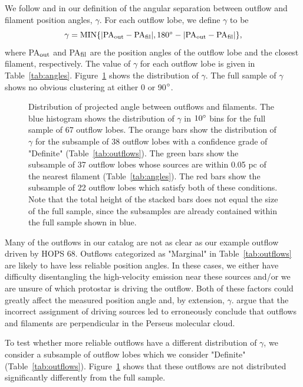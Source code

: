 \documentclass[twocolumn]{aastex63}
\newcommand{\nlobes}{67}
\newcommand{\example}{HOPS 68}
\begin{document}
We follow \citet{Stephens17} and \citet{Kong19} in our definition of the angular separation between outflow and filament position angles, $\gamma$. For each outflow lobe, we define $\gamma$ to be 
\begin{equation}
    \gamma = \rm{MIN}\{|\rm{PA}_{\rm out} - \rm{PA}_{\rm fil}|, 180\degr - |\rm{PA}_{\rm out} - \rm{PA}_{\rm fil}|\},
\end{equation}
where PA$_{\rm out}$ and PA$_{\rm fil}$ are the position angles of the outflow lobe and the closest filament, respectively. The value of $\gamma$ for each outflow lobe is given in Table~\ref{tab:angles}. Figure~\ref{fig:gamma_hist} shows the distribution of $\gamma$. The full sample of $\gamma$ shows no obvious clustering at either 0 or 90$\mbox{$^\circ$}$.

\begin{figure}
\caption{Distribution of projected angle between outflows and filaments. The blue histogram shows the distribution of $\gamma$ in $10\mbox{$^\circ$}$ bins for the full sample of \nlobes{} outflow lobes. The orange bars show the distribution of $\gamma$ for the subsample of 38 outflow lobes with a confidence grade of "Definite" (Table~\ref{tab:outflows}). The green bars show the subsample of 37 outflow lobes whose sources are within 0.05 pc of the nearest filament (Table~\ref{tab:angles}). The red bars show the subsample of 22 outflow lobes which satisfy both of these conditions. Note that the total height of the stacked bars does not equal the size of the full sample, since the subsamples are already contained within the full sample shown in blue. \label{fig:gamma_hist}}
\end{figure}

Many of the outflows in our catalog are not as clear as our example outflow driven by \example{}. Outflows categorized as "Marginal" in Table~\ref{tab:outflows} are likely to have less reliable position angles. In these cases, we either have difficulty disentangling the high-velocity emission near these sources and/or we are unsure of which protostar is driving the outflow. Both of these factors could greatly affect the measured position angle and, by extension, $\gamma$. \citet{Stephens17} argue that the incorrect assignment of driving sources led \citet{Anathpindika08} to erroneously conclude that outflows and filaments are perpendicular in the Perseus molecular cloud.

To test whether more reliable outflows have a different distribution of $\gamma$, we consider a subsample of outflow lobes which we consider "Definite" (Table~\ref{tab:outflows}). Figure~\ref{fig:gamma_hist} shows that these outflows are not distributed significantly differently from the full sample.
\end{document}
